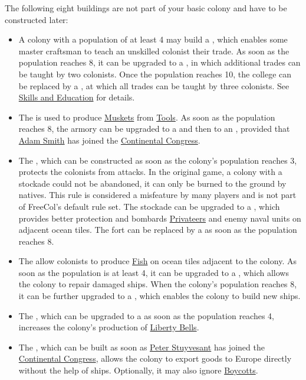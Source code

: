 \documentclass[12pt]{book}
\begin{document}
The following eight buildings are not part of your basic colony and
have to be constructed later:

\begin{itemize}
\item A colony with a population of at least 4 may build a
  , which enables some master craftsman to teach
  an unskilled colonist their trade. As soon as the population reaches
  8, it can be upgraded to a , in which additional
  trades can be taught by two colonists. Once the population reaches
  10, the college can be replaced by a , at which
  all trades can be taught by three colonists. See \hyperlink{Skills
  and Education}{Skills and Education} for details.

\item The  is used to produce
  \hyperlink{Muskets}{Muskets} from \hyperlink{Tools}{Tools}. As soon
  as the population reaches 8, the armory can be upgraded to a
   and then to an , provided that
  \hyperlink{Adam Smith}{Adam Smith} has joined the
  \hyperlink{Continental Congress}{Continental Congress}.

\item The , which can be constructed as soon as the
  colony's population reaches 3, protects the colonists from
  attacks. In the original game, a colony with a stockade could not be
  abandoned, it can only be burned to the ground by natives. This rule
  is considered a misfeature by many players and is not part of
  FreeCol's default rule set. The stockade can be upgraded to a
  , which provides better protection and bombards
  \hyperlink{Privateer}{Privateers} and enemy naval units on adjacent
  ocean tiles. The fort can be replaced by a  as
  soon as the population reaches 8.

\item The  allow colonists to produce
  \hyperlink{Fish}{Fish} on ocean tiles adjacent to the colony. As
  soon as the population is at least 4, it can be upgraded to a
  , which allows the colony to repair damaged
  ships. When the colony's population reaches 8, it can be further
  upgraded to a , which enables the colony to build
  new ships.

\item The , which can be upgraded to a
   as soon as the population reaches 4, increases
  the colony's production of \hyperlink{Liberty Bells}{Liberty Bells}.

\item The , which can
  be built as soon as \hyperlink{Peter Stuyvesant}{Peter Stuyvesant}
  has joined the \hyperlink{Continental Congress}{Continental
  Congress}, allows the colony to export goods to Europe directly
  without the help of ships. Optionally, it may also ignore
  \hyperlink{Boycotts}{Boycotts}.

\end{itemize}
\end{document}
